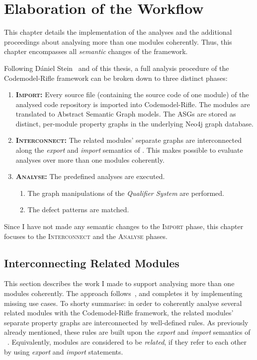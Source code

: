 \chapter{Elaboration of the Workflow}
\label{chapter:elaboration}

This chapter details the implementation of the analyses and the additional proceedings about analysing more than one \es modules coherently. Thus, this chapter encompasses all \emph{semantic} changes of the framework.

Following Dániel Stein~\cite{stein-daniel-msc} and  of this thesis, a full analysis procedure of the Codemodel-Rifle framework can be broken down to three distinct phases:

\begin{enumerate}
\item \textsc{\textbf{Import:}} Every \es source file (containing the source code of one \es module) of the analysed code repository is imported into Codemodel-Rifle. The modules are translated to Abstract Semantic Graph models. The ASGs are stored as distinct, per-module property graphs in the underlying Neo4j graph database.
\item \textsc{\textbf{Interconnect:}} The related modules' separate graphs are interconnected along the \emph{export} and \emph{import} semantics of \es. This makes possible to evaluate analyses over more than one modules coherently.
\item \textsc{\textbf{Analyse:}} The predefined analyses are executed.
	\begin{enumerate}
	\item The graph manipulations of the \emph{Qualifier System} are performed.
	\item The defect patterns are matched.
	\end{enumerate}
\end{enumerate}

Since I have not made any semantic changes to the \textsc{Import} phase, this chapter focuses to the \textsc{Interconnect} and the \textsc{Analyse} phases.


\section{Interconnecting Related \es Modules}

This section describes the work I made to support analysing more than one \es modules coherently. The approach follows~\cite{stein-daniel-msc}, and completes it by implementing missing use cases. To shorty summarise: in order to coherently analyse several related \es modules with the Codemodel-Rifle framework, the related modules' separate property graphs are interconnected by well-defined rules. As previously already mentioned, these rules are built upon the \emph{export} and \emph{import} semantics of \es~\cite{exploringes6}. Equivalently, \es modules are considered to be \emph{related}, if they refer to each other by using \emph{export} and \emph{import} statements.


